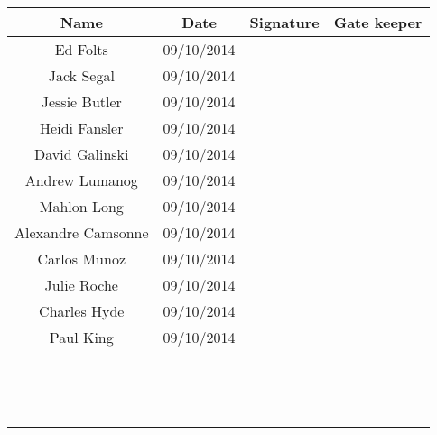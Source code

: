 \documentclass{article}
\begin{document}
\begin{tabular}{|c|c|c|c|}
\hline
Name & Date & Signature & Gate keeper\\
\hline
Ed Folts & 09/10/2014 & &\\
\hline
Jack Segal & 09/10/2014 & &\\
\hline
Jessie Butler & 09/10/2014 & &\\
\hline
Heidi Fansler& 09/10/2014 & &\\
\hline
David Galinski& 09/10/2014 & &\\
\hline
Andrew Lumanog& 09/10/2014 & &\\
\hline
Mahlon Long & 09/10/2014 & &\\
\hline
Alexandre Camsonne & 09/10/2014 & &\\
\hline
Carlos Munoz & 09/10/2014 & &\\
\hline
Julie Roche & 09/10/2014 & &\\
\hline
Charles Hyde & 09/10/2014 & &\\
\hline
Paul King  & 09/10/2014 & &\\
\hline
  &  & &\\
\hline
  & & &\\
\hline
  &  & &\\
\hline
  &  & &\\
\hline
  &  & &\\
\hline
  &  & &\\
\hline
  &  & &\\
\hline
  &  & &\\
\hline
  & & &\\
\hline
  &  & &\\
\hline
  &  & &\\
\hline
  &  & &\\
\hline
  &  & &\\
\hline
  &  & &\\
\hline
\end{tabular}
\end{document}
